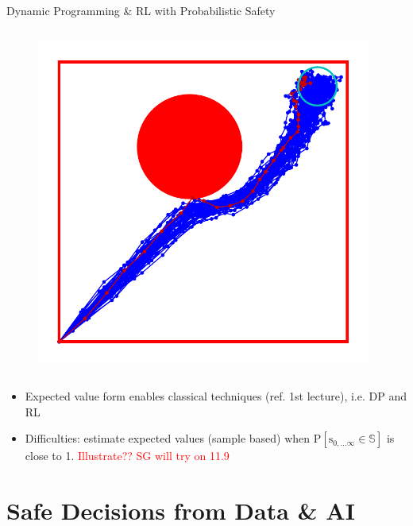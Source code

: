 \documentclass[lecture]{beamer}
\newcommand{\vect}[1]{\ensuremath{\boldsymbol{\mathrm{#1}}}}
\begin{document}
\begin{frame}{\normalsize Dynamic Programming \& RL with Probabilistic Safety}
\begin{columns}[t]
 \begin{figure}
   \includegraphics[width=0.98\textwidth]{Codes/BasicsSafety/ProbabilisticModel.pdf}%
  \end{figure}
\end{columns}
\begin{itemize}
\item Expected value form enables classical techniques (ref. 1st lecture), i.e. DP and RL
\item Difficulties: estimate expected values (sample based) when $\mathrm{P}\left[ \vect s_{0,\ldots\infty}\in \mathbb S\right]$ is close to 1. \textcolor{red}{Illustrate?? SG will try on 11.9}
\end{itemize}


\end{frame}

\section{Safe Decisions from Data \& AI}
\end{document}
